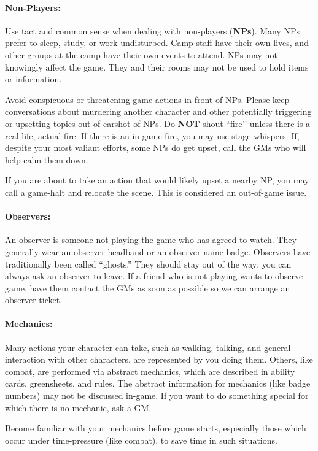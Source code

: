 \documentclass[sheet]{GL2020}
\begin{document}
\paragraph{Non-Players:} Use tact and common sense when dealing with non-players ({\bf NPs}).  Many NPs prefer to sleep, study, or work undisturbed. Camp staff have their own lives, and other groups at the camp have their own events to attend. NPs may not knowingly affect the game. They and their rooms may not be used to hold items or information.

Avoid conspicuous or threatening game actions in front of NPs. Please keep conversations about murdering another character and other potentially triggering or upsetting topics out of earshot of NPs. Do \textbf{NOT} shout ``fire’’ unless there is a real life, actual fire. If there is an in-game fire, you may use stage whispers. If, despite your most valiant efforts, some NPs do get upset, call the GMs who will help calm them down.

If you are about to take an action that would likely upset a nearby NP, you may call a game-halt and relocate the scene. This is considered an out-of-game issue.

\paragraph{Observers:} An observer is someone not playing the game who has agreed to watch.  They generally wear an observer headband or an observer name-badge.  Observers have traditionally been called ``ghosts.''  They should stay out of the way; you can always ask an observer to leave.  If a friend who is not playing wants to observe game, have them contact the GMs as soon as possible so we can arrange an observer ticket.

\paragraph{Mechanics:} Many actions your character can take, such as walking, talking, and general interaction with other characters, are represented by you doing them.  Others, like combat, are performed via abstract mechanics, which are described in ability cards, greensheets, and rules.  The abstract information for mechanics (like badge numbers) may not be discussed in-game.  If you want to do something special for which there is no mechanic, ask a GM.

Become familiar with your mechanics before game starts, especially those which occur under time-pressure (like combat), to save time in such situations.
\end{document}
